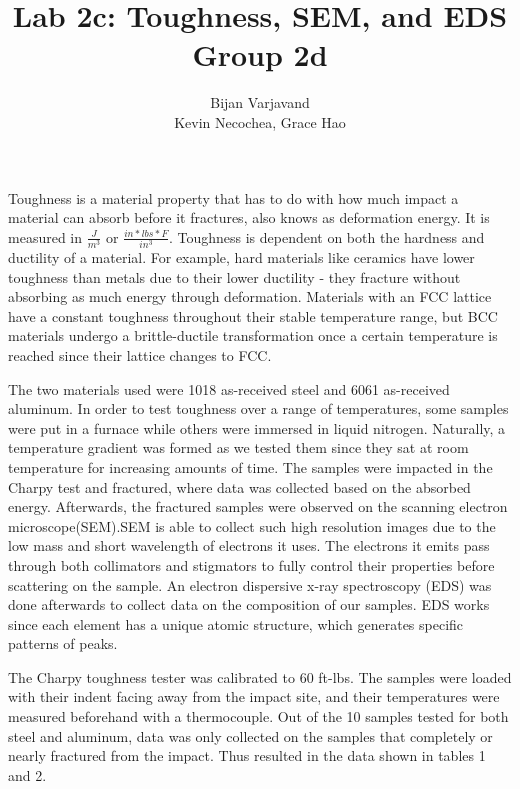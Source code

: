 \documentclass{article}
\author{Bijan Varjavand\\ Kevin Necochea, Grace Hao}
\title{Lab 2c: Toughness, SEM, and EDS\\Group 2d}
\begin{document}
\maketitle

\clearpage

Toughness is a material property that has to do with how much impact a material can absorb before it fractures, also knows as deformation energy. It is measured in $\frac{J}{m^3}$ or $\frac{in*lbs*F}{in^3}$. Toughness is dependent on both the hardness and ductility of a material. For example, hard materials like ceramics have lower toughness than metals due to their lower ductility - they fracture without absorbing as much energy through deformation. Materials with an FCC lattice have a constant toughness throughout their stable temperature range, but BCC materials undergo a brittle-ductile transformation once a certain temperature is reached since their lattice changes to FCC.

The two materials used were 1018 as-received steel and 6061 as-received aluminum. In order to test toughness over a range of temperatures, some samples were put in a furnace while others were immersed in liquid nitrogen. Naturally, a temperature gradient was formed as we tested them since they sat at room temperature for increasing amounts of time. The samples were impacted in the Charpy test and fractured, where data was collected based on the absorbed energy. Afterwards, the fractured samples were observed on the scanning electron microscope(SEM).SEM is able to collect such high resolution images due to the low mass and short wavelength of electrons it uses. The electrons it emits pass through both collimators and stigmators to fully control their properties before scattering on the sample. An electron dispersive x-ray spectroscopy (EDS) was done afterwards to collect data on the composition of our samples. EDS works since each element has a unique atomic structure, which generates specific patterns of peaks.

The Charpy toughness tester was calibrated to 60 ft-lbs. The samples were loaded with their indent facing away from the impact site, and their temperatures were measured beforehand with a thermocouple. Out of the 10 samples tested for both steel and aluminum, data was only collected on the samples that completely or nearly fractured from the impact. Thus resulted in the data shown in tables 1 and 2. 
\end{document}
